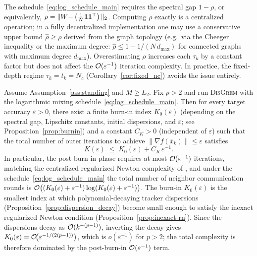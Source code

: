 \documentclass[review,onefignum,onetabnum]{siamart171218}
\begin{document}
\begin{remark}\label{rem:rho_knowledge}
The schedule~\eqref{eq:log_schedule_main} requires the spectral
gap $1{-}\rho$, or equivalently, $\rho=\|W{-}\left(\frac{1}{N}\mathbf{1}\mathbf{1}^\top\right)\|_2$.
Computing $\rho$ exactly is a centralized operation; in a fully
decentralized implementation one may use a conservative upper
bound $\hat\rho\ge\rho$ derived from the graph topology
(e.g.\ via the Cheeger inequality or the maximum degree:
$\hat\rho\le 1-1/(N\,d_{\max})$ for connected graphs with
maximum degree $d_{\max}$).
Overestimating $\rho$ increases each $\tau_k$ by a constant
factor but does not affect the $\mathcal{O}(\varepsilon^{-1})$ iteration
complexity.
In practice, the fixed-depth regime $\tau_k{=}t_k{=}N_c$
(Corollary~\ref{cor:fixed_nc}) avoids the issue entirely.
\end{remark}

\begin{theorem}\label{thm:main}
Assume Assumption~\ref{ass:standing} and $M\ge L_2$.
Fix $p>2$ and run \textsc{DisGrem} with the logarithmic mixing schedule~\eqref{eq:log_schedule_main}.
Then for every target accuracy $\varepsilon>0$, there exist a finite burn-in index $K_0(\varepsilon)$
(depending on the spectral gap, Lipschitz constants, initial dispersions, and $\varepsilon$;
see Proposition~\ref{prop:burnin})
and a constant $C_K>0$ (independent of $\varepsilon$) such that the total number of
outer iterations to achieve $\|\nabla f(\bar x_k)\|\le \varepsilon$ satisfies
\[
K(\varepsilon)\;\le\; K_0(\varepsilon) + C_K\,\varepsilon^{-1}.
\]
In particular,
the post-burn-in phase requires at most $\mathcal{O}(\varepsilon^{-1})$ iterations,
matching the centralized regularized Newton complexity of \citet{mishchenko2023rn},
and under the schedule~\eqref{eq:log_schedule_main} the total number of neighbor communication rounds is
$\mathcal{O}\big((K_0(\varepsilon)+\varepsilon^{-1})\log(K_0(\varepsilon)+\varepsilon^{-1})\big)$.
The burn-in $K_0(\varepsilon)$ is the smallest index at which
polynomial-decaying tracker dispersions
(Proposition~\ref{prop:dispersion_decay}) become small enough to satisfy the
inexact regularized Newton condition (Proposition~\ref{prop:inexact-rn}).
Since the dispersions decay as $\mathcal{O}(k^{-(p-1)})$, inverting the decay gives
$K_0(\varepsilon)=\mathcal{O}\!\bigl(\varepsilon^{-1/(2(p-1))}\bigr)$,
which is $o(\varepsilon^{-1})$ for $p>2$; the total complexity is therefore
dominated by the post-burn-in $\mathcal{O}(\varepsilon^{-1})$ term.
\end{theorem}
\end{document}
